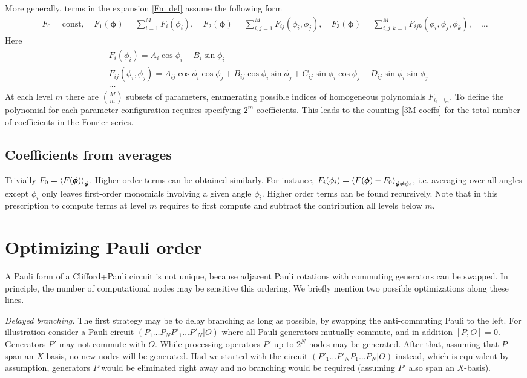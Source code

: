\documentclass[twocolumn, amsfonts, amssymb, aps, nofootinbib]{revtex4-2}
\newcommand{\CP}{Clifford+Pauli}
\begin{document}
More generally, terms in the expansion \eqref{Fm def} assume the following form
\begin{align}
F_0=\text{const},\quad
F_1(\pmb\phi)=\sum_{i=1}^M F_i(\phi_i), \quad F_2(\pmb\phi)=\sum_{i,j=1}^M F_{ij}(\phi_i,\phi_j), \quad F_3(\pmb\phi)=\sum_{i,j,k=1}^M F_{ijk}(\phi_i,\phi_j,\phi_k),\quad\dots
\end{align}
Here
\begin{align}
\begin{split}
&F_i(\phi_i)=A_i\cos\phi_i+B_i\sin\phi_i\\
&F_{ij}(\phi_i,\phi_j)=A_{ij}\cos\phi_i\cos\phi_j+B_{ij}\cos\phi_i\sin\phi_j+C_{ij}\sin\phi_i\cos\phi_j+D_{ij}\sin\phi_i\sin\phi_j\\
&\dots
\end{split}
\end{align}
At each level $m$ there are $\binom{M}{m}$ subsets of parameters, enumerating possible indices of homogeneous polynomials $F_{i_1\dots i_m}$. To define the polynomial for each parameter configuration requires specifying $2^m$ coefficients. This leads to the counting \eqref{3M coeffs} for the total number of coefficients in the Fourier series.
\subsection{Coefficients from averages}
Trivially $F_0=\Braket{F(\pmb\phi)}_{\pmb\phi}$. Higher order terms can be obtained similarly. For instance, $F_i(\phi_i)=\Braket{F(\pmb\phi)-F_0}_{\pmb\phi\neq\phi_i}$, i.e. averaging over all angles except $\phi_i$ only leaves first-order monomials involving a given angle $\phi_i$. Higher order terms can be found recursively. Note that in this prescription to compute terms at level $m$ requires to first compute and subtract the contribution all levels below $m$.

\section{Optimizing Pauli order} \label{app pauli}
A Pauli form of a \CP{} circuit is not unique, because adjacent Pauli rotations with commuting generators can be swapped. In principle, the number of computational nodes may be sensitive this ordering. We briefly mention two possible optimizations along these lines.

\textit{Delayed branching.} The first strategy may be to delay branching as long as possible, by swapping the anti-commuting Pauli to the left. For illustration consider a Pauli circuit  $(P_{1}\dots P_{N} P'_{1}\dots P'_{N}|O)$ where all Pauli generators mutually commute, and in addition $[P,O]=0$. Generators $P'$ may not commute with $O$. While processing operators $P'$ up to $2^N$ nodes may be generated. After that, assuming that $P$ span an $X$-basis, no new nodes will be generated. Had we started with the circuit $(P'_{1}\dots P'_{N}P_{1}\dots P_{N}|O)$ instead, which is equivalent by assumption, generators $P$ would be eliminated right away and no branching would be required (assuming $P'$ also span an $X$-basis). 
\end{document}
